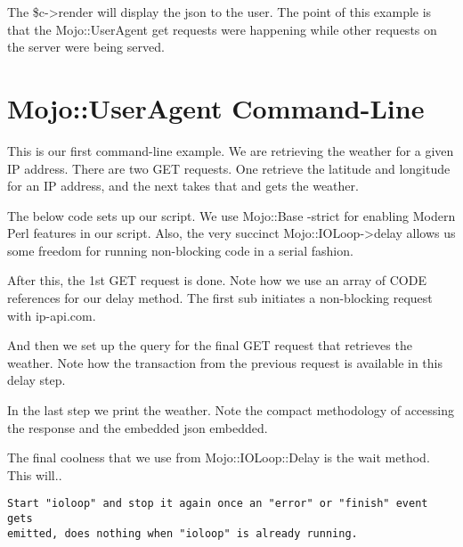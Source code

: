 \documentclass[14pt]{extreport}
\newcommand\Small{\fontsize{12}{13.0}\fontencoding{T1}\selectfont}
\newcommand*\LSTfont{\Small\ttfamily\SetTracking{encoding=*}{-60}\lsstyle}
\begin{document}


The \$c->render will display the json to the user.  The point of this example
is that the Mojo::UserAgent get requests were happening while other requests on
the server were being served.

\section{Mojo::UserAgent Command-Line}

This is our first command-line example.  We are retrieving the weather for a
given IP address.  There are two GET requests.  One retrieve the latitude and
longitude for an IP address, and the next takes that and gets the weather.

The below code sets up our script.  We use Mojo::Base -strict for enabling
Modern Perl features in our script.  Also, the very succinct
Mojo::IOLoop->delay allows us some freedom for running non-blocking code in a
serial fashion.



After this, the 1st GET request is done.  Note how we use an array of CODE
references for our delay method.  The first sub initiates a non-blocking
request with ip-api.com.



And then we set up the query for the final GET request that retrieves the
weather.  Note how the transaction from the previous request is available in
this delay step.



In the last step we print the weather.  Note the compact methodology of accessing
the response and the embedded json embedded.



The final coolness that we use from Mojo::IOLoop::Delay is the wait method.
This will..

\begin{lstlisting}[style=BlockStyle]
Start "ioloop" and stop it again once an "error" or "finish" event gets
emitted, does nothing when "ioloop" is already running.
\end{lstlisting}
\end{document}
